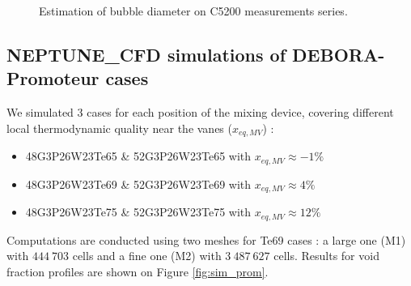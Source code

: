 \begin{figure}[!h]
\centering
{}

\caption{Estimation of bubble diameter on C5200 measurements series.}
\label{fig:exp_C52_dvap}
\end{figure}




\subsection{NEPTUNE\_CFD simulations of DEBORA-Promoteur cases}

We simulated 3 cases for each position of the mixing device, covering different local thermodynamic quality near the vanes ($x_{eq,MV}$) :

\begin{itemize}
\item 48G3P26W23Te65 \& 52G3P26W23Te65 with $x_{eq,MV}\approx -1\%$ 
\item 48G3P26W23Te69 \& 52G3P26W23Te69 with $x_{eq,MV}\approx 4\%$ 
\item 48G3P26W23Te75 \& 52G3P26W23Te75 with $x_{eq,MV}\approx 12\%$ 
\end{itemize}

Computations are conducted using two meshes for Te69 cases : a large one (M1) with $444~703$ cells and a fine one (M2) with $3~487~627$ cells. Results for void fraction profiles are shown on Figure \ref{fig:sim_prom}.


